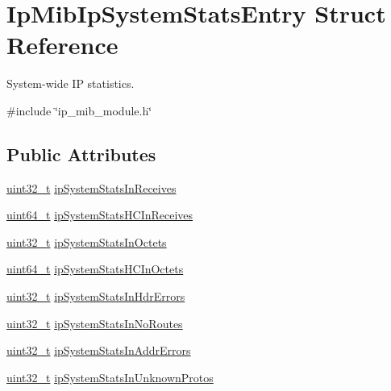 \hypertarget{structIpMibIpSystemStatsEntry}{}\section{Ip\+Mib\+Ip\+System\+Stats\+Entry Struct Reference}
\label{structIpMibIpSystemStatsEntry}


System-\/wide IP statistics.  




{\ttfamily \#include \char`\"{}ip\+\_\+mib\+\_\+module.\+h\char`\"{}}

\subsection*{Public Attributes}
\begin{DoxyCompactItemize}
\item 
\hyperlink{stdint_8h_a435d1572bf3f880d55459d9805097f62}{uint32\+\_\+t} \hyperlink{structIpMibIpSystemStatsEntry_a776b8aed16775b4b17913d98d84d6f6e}{ip\+System\+Stats\+In\+Receives}
\item 
\hyperlink{stdint_8h_aec6fcb673ff035718c238c8c9d544c47}{uint64\+\_\+t} \hyperlink{structIpMibIpSystemStatsEntry_a723bd5c8c3db31e0bca717ab8eaf914a}{ip\+System\+Stats\+H\+C\+In\+Receives}
\item 
\hyperlink{stdint_8h_a435d1572bf3f880d55459d9805097f62}{uint32\+\_\+t} \hyperlink{structIpMibIpSystemStatsEntry_a7f8f0effe50a2f21ae5b450f22a36cbe}{ip\+System\+Stats\+In\+Octets}
\item 
\hyperlink{stdint_8h_aec6fcb673ff035718c238c8c9d544c47}{uint64\+\_\+t} \hyperlink{structIpMibIpSystemStatsEntry_adf78ae7c1b825d577d18c735a4a337e7}{ip\+System\+Stats\+H\+C\+In\+Octets}
\item 
\hyperlink{stdint_8h_a435d1572bf3f880d55459d9805097f62}{uint32\+\_\+t} \hyperlink{structIpMibIpSystemStatsEntry_afc358802808e5596ca9a8fb16a9e6fdd}{ip\+System\+Stats\+In\+Hdr\+Errors}
\item 
\hyperlink{stdint_8h_a435d1572bf3f880d55459d9805097f62}{uint32\+\_\+t} \hyperlink{structIpMibIpSystemStatsEntry_a41fe3473a8b14bffe0aa7378ed82cb3c}{ip\+System\+Stats\+In\+No\+Routes}
\item 
\hyperlink{stdint_8h_a435d1572bf3f880d55459d9805097f62}{uint32\+\_\+t} \hyperlink{structIpMibIpSystemStatsEntry_adde86dc6e3631e3dd3a61ed19a4c7893}{ip\+System\+Stats\+In\+Addr\+Errors}
\item 
\hyperlink{stdint_8h_a435d1572bf3f880d55459d9805097f62}{uint32\+\_\+t} \hyperlink{structIpMibIpSystemStatsEntry_ac7a0852e798ef2711b36d0598bda07a5}{ip\+System\+Stats\+In\+Unknown\+Protos}

\end{DoxyCompactItemize}
